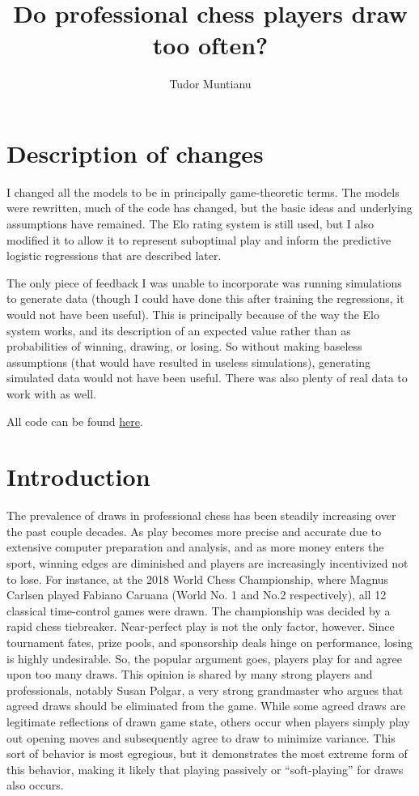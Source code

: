\documentclass{article}
\begin{document}
\title{Do professional chess players draw too often?}
\author{Tudor Muntianu}
\maketitle

\section*{Description of changes}
I changed all the models to be in principally game-theoretic terms.
The models were rewritten, much of the code has changed, but the basic ideas
and underlying assumptions have remained.
The Elo rating system is still used, but I also modified it to allow it to represent
suboptimal play and inform the predictive logistic regressions that are described later.

The only piece of feedback I was unable to incorporate was running simulations to generate
data (though I could have done this after training the regressions, it would not have been useful).
This is principally because of the way the Elo system works, and its description of an expected
value rather than as probabilities of winning, drawing, or losing.
So without making baseless assumptions (that would have resulted in useless simulations), generating
simulated data would not have been useful.
There was also plenty of real data to work with as well.

All code can be found \href{https://github.com/tmuntianu/chessdraws}{here}.

\section{Introduction}

The prevalence of draws in professional chess has been steadily increasing over the past couple decades.
As play becomes more precise and accurate due to extensive computer preparation and analysis,
and as more money enters the sport, winning edges are diminished and players are increasingly
incentivized not to lose.
For instance, at the 2018 World Chess Championship, where Magnus Carlsen played Fabiano Caruana (World No. 1 and No.2 respectively),
all 12 classical time-control games were drawn.
The championship was decided by a rapid chess tiebreaker.
Near-perfect play is not the only factor, however.
Since tournament fates, prize pools, and sponsorship deals hinge on performance, losing is highly undesirable.
So, the popular argument goes, players play for and agree upon too many draws. This opinion is shared by
many strong players and professionals, notably Susan Polgar, a very strong grandmaster who argues that agreed draws should be eliminated from the game.
While some agreed draws are legitimate reflections of drawn game state, others occur when players simply play out opening moves and subsequently agree to draw
to minimize variance. This sort of behavior is most egregious, but it demonstrates the most extreme form of this behavior, making it likely
that playing passively or ``soft-playing'' for draws also occurs.
\end{document}
